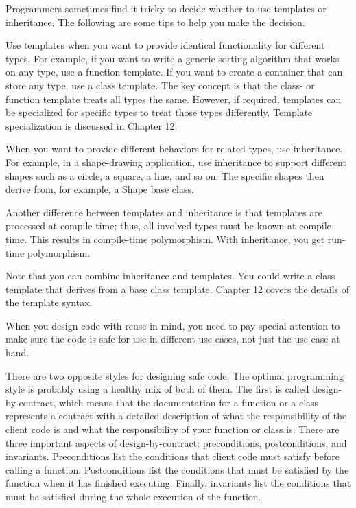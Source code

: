 
Programmers sometimes find it tricky to decide whether to use templates or inheritance. The following are some tips to help you make the decision.

Use templates when you want to provide identical functionality for different types. For example, if you want to write a generic sorting algorithm that works on any type, use a function template. If you want to create a container that can store any type, use a class template. The key concept is that the class- or function template treats all types the same. However, if required, templates can be specialized for specific types to treat those types differently. Template specialization is discussed in Chapter 12.

When you want to provide different behaviors for related types, use inheritance. For example, in a shape-drawing application, use inheritance to support different shapes such as a circle, a square, a line, and so on. The specific shapes then derive from, for example, a Shape base class.

Another difference between templates and inheritance is that templates are processed at compile time; thus, all involved types must be known at compile time. This results in compile-time polymorphism. With inheritance, you get run-time polymorphism.

Note that you can combine inheritance and templates. You could write a class template that derives from a base class template. Chapter 12 covers the details of the template syntax.


When you design code with reuse in mind, you need to pay special attention to make sure the code is safe for use in different use cases, not just the use case at hand.

There are two opposite styles for designing safe code. The optimal programming style is probably using a healthy mix of both of them. The first is called design-by-contract, which means that the documentation for a function or a class represents a contract with a detailed description of what the responsibility of the client code is and what the responsibility of your function or class is. There are three important aspects of design-by-contract: preconditions, postconditions, and invariants. Preconditions list the conditions that client code must satisfy before calling a function. Postconditions list the conditions that must be satisfied by the function when it has finished executing. Finally, invariants list the conditions that must be satisfied during the whole execution of the function.

